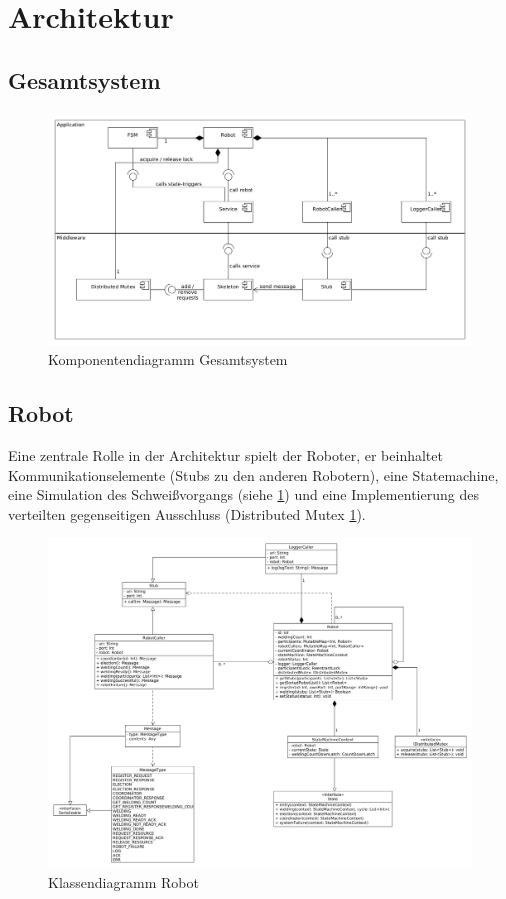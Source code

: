 \section{Architektur}

\subsection{Gesamtsystem}

\begin{figure}[h]
 \includegraphics[width=\textwidth]{../diagrams/2_gesamtsystem.png}
 \caption{Komponentendiagramm Gesamtsystem}
 \label{fig:gesamtsystem}
\end{figure}

\clearpage

\subsection{Robot}

Eine zentrale Rolle in der Architektur spielt der Roboter, er beinhaltet Kommunikationselemente (Stubs 
\citep{tanenbaumvansteen} zu den anderen Robotern), eine Statemachine, eine Simulation des
Schweißvorgangs (siehe \ref{fig:gesamtsystem}) und eine Implementierung des verteilten gegenseitigen
Ausschluss (Distributed Mutex \ref{fig:gesamtsystem}).

\begin{figure}[h]
 \includegraphics[width=\textwidth]{../diagrams/3_robot_klassendiagramm.png}
 \caption{Klassendiagramm Robot}
 \label{fig:class_robot}
\end{figure}

